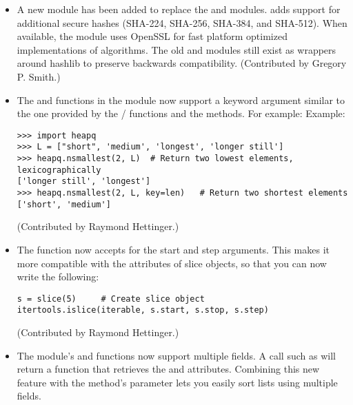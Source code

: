 \documentclass{howto}
\begin{document}
\begin{itemize}





\item A new  module has been added to replace the
 and  modules.   adds support
for additional secure hashes (SHA-224, SHA-256, SHA-384, and SHA-512).
When available, the module uses OpenSSL for fast platform optimized
implementations of algorithms.  The old  and 
modules still exist as wrappers around hashlib to preserve backwards
compatibility.  (Contributed by Gregory P. Smith.)

\item The  and 
 functions in the  module 
now support a  keyword argument similar to the one
provided by the / functions
and the  methods.  For example:
Example:

\begin{verbatim}
>>> import heapq
>>> L = ["short", 'medium', 'longest', 'longer still']
>>> heapq.nsmallest(2, L)  # Return two lowest elements, lexicographically
['longer still', 'longest']
>>> heapq.nsmallest(2, L, key=len)   # Return two shortest elements
['short', 'medium']
\end{verbatim}

(Contributed by Raymond Hettinger.)

\item The  function now accepts
 for the start and step arguments.  This makes it more
compatible with the attributes of slice objects, so that you can now write
the following:

\begin{verbatim}
s = slice(5)     # Create slice object
itertools.islice(iterable, s.start, s.stop, s.step)
\end{verbatim}

(Contributed by Raymond Hettinger.)

\item The  module's  
and  functions now support multiple fields.  
A call such as 
will return a function 
that retrieves the  and  attributes.  Combining 
this new feature with the  method's  parameter 
lets you easily sort lists using multiple fields.


\end{itemize}
\end{document}
